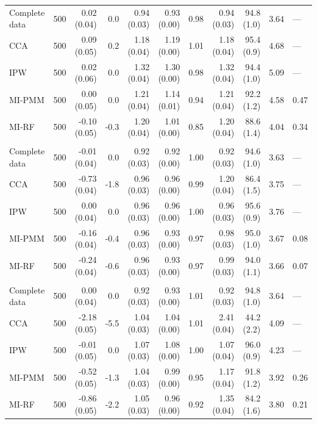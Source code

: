 \documentclass[11pt,a4paper]{article}
\begin{document}
\begin{landscape}
\begin{longtable}{l|rrrrrrrrrl}
\midrule\addlinespace[2.5pt]
\multicolumn{11}{l}{Stunting — MAR 50\%} \\[2.5pt] 
\midrule\addlinespace[2.5pt]
Complete data & 500 & 0.02 (0.04) & 0.0 & 0.94 (0.03) & 0.93 (0.00) & 0.98 & 0.94 (0.03) & 94.8 (1.0) & 3.64 & — \\ 
CCA & 500 & 0.09 (0.05) & 0.2 & 1.18 (0.04) & 1.19 (0.00) & 1.01 & 1.18 (0.04) & 95.4 (0.9) & 4.68 & — \\ 
IPW & 500 & 0.02 (0.06) & 0.0 & 1.32 (0.04) & 1.30 (0.00) & 0.98 & 1.32 (0.04) & 94.4 (1.0) & 5.09 & — \\ 
MI-PMM & 500 & 0.00 (0.05) & 0.0 & 1.21 (0.04) & 1.14 (0.01) & 0.94 & 1.21 (0.04) & 92.2 (1.2) & 4.58 & 0.47 \\ 
MI-RF & 500 & -0.10 (0.05) & -0.3 & 1.20 (0.04) & 1.01 (0.00) & 0.85 & 1.20 (0.04) & 88.6 (1.4) & 4.04 & 0.34 \\ 
\midrule\addlinespace[2.5pt]
\multicolumn{11}{l}{Stunting — MAR-strong 10\%} \\[2.5pt] 
\midrule\addlinespace[2.5pt]
Complete data & 500 & -0.01 (0.04) & 0.0 & 0.92 (0.03) & 0.92 (0.00) & 1.00 & 0.92 (0.03) & 94.6 (1.0) & 3.63 & — \\ 
CCA & 500 & -0.73 (0.04) & -1.8 & 0.96 (0.03) & 0.96 (0.00) & 0.99 & 1.20 (0.04) & 86.4 (1.5) & 3.75 & — \\ 
IPW & 500 & 0.00 (0.04) & 0.0 & 0.96 (0.03) & 0.96 (0.00) & 1.00 & 0.96 (0.03) & 95.6 (0.9) & 3.76 & — \\ 
MI-PMM & 500 & -0.16 (0.04) & -0.4 & 0.96 (0.03) & 0.93 (0.00) & 0.97 & 0.98 (0.03) & 95.0 (1.0) & 3.67 & 0.08 \\ 
MI-RF & 500 & -0.24 (0.04) & -0.6 & 0.96 (0.03) & 0.93 (0.00) & 0.97 & 0.99 (0.03) & 94.0 (1.1) & 3.66 & 0.07 \\ 
\midrule\addlinespace[2.5pt]
\multicolumn{11}{l}{Stunting — MAR-strong 30\%} \\[2.5pt] 
\midrule\addlinespace[2.5pt]
Complete data & 500 & 0.00 (0.04) & 0.0 & 0.92 (0.03) & 0.93 (0.00) & 1.01 & 0.92 (0.03) & 94.8 (1.0) & 3.64 & — \\ 
CCA & 500 & -2.18 (0.05) & -5.5 & 1.04 (0.03) & 1.04 (0.00) & 1.01 & 2.41 (0.04) & 44.2 (2.2) & 4.09 & — \\ 
IPW & 500 & -0.01 (0.05) & 0.0 & 1.07 (0.03) & 1.08 (0.00) & 1.00 & 1.07 (0.04) & 96.0 (0.9) & 4.23 & — \\ 
MI-PMM & 500 & -0.52 (0.05) & -1.3 & 1.04 (0.03) & 0.99 (0.00) & 0.95 & 1.17 (0.04) & 91.8 (1.2) & 3.92 & 0.26 \\ 
MI-RF & 500 & -0.86 (0.05) & -2.2 & 1.05 (0.03) & 0.96 (0.00) & 0.92 & 1.35 (0.04) & 84.2 (1.6) & 3.80 & 0.21 \\ 

\end{longtable}
\end{landscape}
\end{document}
